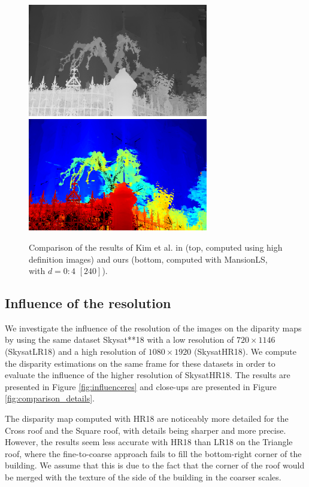 \documentclass{article}
\theoremstyle{definition}
\begin{document}
\begin{figure}[ht]
 \centering
 \includegraphics[width=0.7\textwidth]{images/mansion_kim_resized.png}\\
 \includegraphics[width=0.7\textwidth]{images/MansionLR_240/1521776307225_dmap_050.png}
 \caption{Comparison of the results of Kim et al. in \cite{art:kim13:lfields} (top, computed using high definition images) and ours (bottom, computed with MansionLS, with $d=0:4$ $[240]$).}
 \label{fig:comparison_kim}
\end{figure}


\subsection{Influence of the resolution}


We investigate the influence of the resolution of the images on the diparity maps by using the same dataset Skysat**18 with a low resolution of $720\times 1146$ (SkysatLR18) and a high resolution of $1080\times 1920$ (SkysatHR18). We compute the disparity estimations on the same frame for these datasets in order to evaluate the influence of the higher resolution of SkysatHR18. The results are presented in Figure \ref{fig:influenceres} and close-ups are presented in Figure \ref{fig:comparison_details}. 


The disparity map computed with HR18 are noticeably more detailed for the Cross roof and the Square roof, with details being sharper and more precise. However, the results seem less accurate with HR18 than LR18 on the Triangle roof, where the fine-to-coarse approach fails to fill the bottom-right corner of the building. We assume that this is due to the fact that the corner of the roof would be merged with the texture of the side of the building in the coarser scales.
\end{document}
